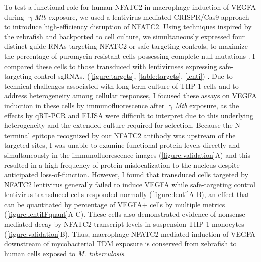 To test a functional role for human NFATC2 in macrophage induction of VEGFA during $\upgamma$\textit{Mtb} exposure, we used a lentivirus\hyp{}mediated CRISPR/Cas9 approach to introduce high\hyp{}efficiency disruption of NFATC2. Using techniques inspired by the zebrafish and backported to cell culture, we simultaneously expressed four distinct guide RNAs targeting NFATC2 or safe\hyp{}targeting controls, to maximize the percentage of puromycin\hyp{}resistant cells possessing complete null mutations \citep{Wu2018}. I compared these cells to those transduced with lentiviruses expressing safe\hyp{}targeting control sgRNAs. (\autoref{figure:targets}, \autoref{table:targets}, \autoref{lenti}) \citep{Kabadi2014, Sanjana2014, Morgens2017, Kitamura2021}. Due to technical challenges associated with long\hyp{}term culture of THP\hyp{}1 cells and to address heterogeneity among cellular responses, I focused these assays on VEGFA induction in these cells by immunofluorescence after $\upgamma$\textit{Mtb} exposure, as the effects by qRT-PCR and ELISA were difficult to interpret due to this underlying heterogeneity and the extended culture required for selection. Because the N\hyp{}terminal epitope recognized by our NFATC2 antibody was upstream of the targeted sites, I was unable to examine functional protein levels directly and simultaneously in the immunofluorescence images (\autoref{figure:validation}A) and this resulted in a high frequency of protein mislocalization to the nucleus despite anticipated loss-of-function. However, I found that transduced cells targeted by NFATC2 lentivirus generally failed to induce VEGFA while safe\hyp{}targeting control lentivirus\hyp{}transduced cells responded normally (\autoref{figure:lenti}A\hyp{}B), an effect that can be quantitated by percentage of VEGFA+ cells by multiple metrics (\autoref{figure:lentiIFquant}A\hyp{}C). These cells also demonstrated evidence of nonsense\hyp{}mediated decay by NFATC2 transcript levels in suspension THP-1 monocytes (\autoref{figure:validation}B). Thus, macrophage NFATC2\hyp{}mediated induction of VEGFA downstream of mycobacterial TDM exposure is conserved from zebrafish to human cells exposed to \textit{M. tuberculosis}.

